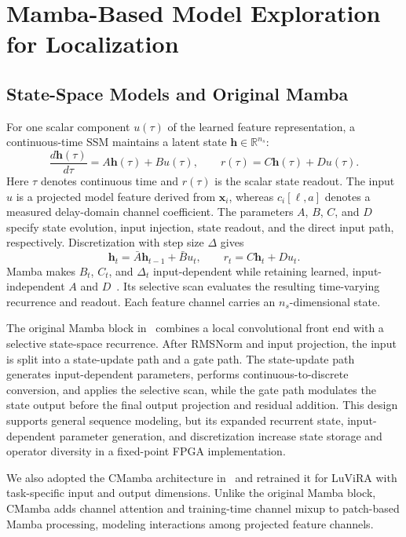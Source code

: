 \documentclass[lettersize,journal]{IEEEtran}
\begin{document}
\section{Mamba-Based Model Exploration for Localization}
\label{sec:algorithm}

\subsection{State-Space Models and Original Mamba}

For one scalar component $u(\tau)$ of the learned feature representation,
a continuous-time SSM maintains a latent state
$\mathbf{h}\in\mathbb{R}^{n_s}$:
\begin{equation}
\frac{d\mathbf{h}(\tau)}{d\tau}=A\mathbf{h}(\tau)+Bu(\tau),
\qquad r(\tau)=C\mathbf{h}(\tau)+Du(\tau).
\label{eq:continuous_ssm}
\end{equation}
Here $\tau$ denotes continuous time and $r(\tau)$ is the scalar state readout.
The input $u$ is a projected model feature derived from $\mathbf{x}_i$, whereas
$c_i[\ell,a]$ denotes a measured delay-domain channel coefficient.
The parameters $A$, $B$, $C$, and $D$ specify state evolution, input injection,
state readout, and the direct input path, respectively. Discretization with
step size $\Delta$ gives
\begin{equation}
\mathbf{h}_t=\bar A\mathbf{h}_{t-1}+\bar B u_t,
\qquad r_t=C\mathbf{h}_t+Du_t.
\label{eq:discrete_ssm}
\end{equation}
Mamba makes $B_t$, $C_t$, and $\Delta_t$ input-dependent while retaining
learned, input-independent $A$ and $D$~\cite{Mamba2023}. Its selective scan
evaluates the resulting time-varying recurrence and readout. Each feature
channel carries an $n_s$-dimensional state.

The original Mamba block in~\cite{Mamba2023} combines a local convolutional
front end with a selective state-space recurrence. After RMSNorm and input
projection, the input is split into a state-update path and a gate path. The
state-update path generates input-dependent parameters, performs
continuous-to-discrete conversion, and applies the selective scan, while the
gate path modulates the state output before the final output projection and
residual addition. This design supports general sequence modeling, but its
expanded recurrent state, input-dependent parameter generation, and
discretization increase state storage and operator diversity in a fixed-point
FPGA implementation.

We also adopted the CMamba architecture in~\cite{zeng2024cmamba} and retrained it for LuViRA with
task-specific input and output dimensions. Unlike the original Mamba block,
CMamba adds channel attention and training-time channel mixup to patch-based
Mamba processing, modeling interactions among projected feature channels.
\end{document}
